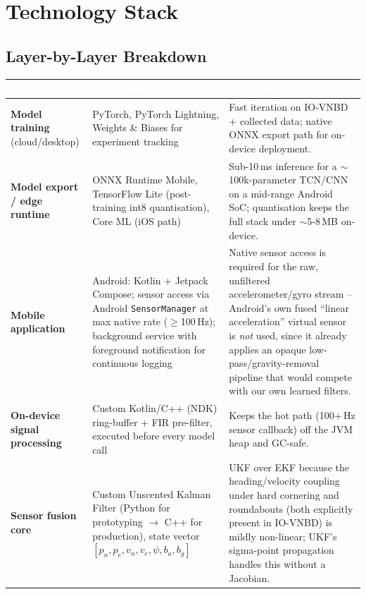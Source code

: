 \documentclass[10.5pt]{article}
\begin{document}
\section{Technology Stack}

\subsection{Layer-by-Layer Breakdown}

\begin{longtable}{@{}p{2.7cm}p{4.6cm}p{7.4cm}@{}}
\toprule
\rowcolor{tablehead}
\textcolor{white}{\textbf{Layer}} & \textcolor{white}{\textbf{Technology}} & \textcolor{white}{\textbf{Why this choice}} \\
\midrule
\endhead
\textbf{Model training} (cloud/desktop) & PyTorch, PyTorch Lightning, Weights \& Biases for experiment tracking & Fast iteration on IO-VNBD + collected data; native ONNX export path for on-device deployment. \\
\textbf{Model export / edge runtime} & ONNX Runtime Mobile, TensorFlow Lite (post-training int8 quantisation), Core ML (iOS path) & Sub-10\,ms inference for a $\sim$100k-parameter TCN/CNN on a mid-range Android SoC; quantisation keeps the full stack under $\sim$5-8\,MB on-device. \\
\textbf{Mobile application} & Android: Kotlin + Jetpack Compose; sensor access via Android \texttt{SensorManager} at max native rate ($\ge$100\,Hz); background service with foreground notification for continuous logging & Native sensor access is required for the raw, unfiltered accelerometer/gyro stream -- Android's own fused ``linear acceleration'' virtual sensor is \emph{not} used, since it already applies an opaque low-pass/gravity-removal pipeline that would compete with our own learned filters. \\
\textbf{On-device signal processing} & Custom Kotlin/C++ (NDK) ring-buffer + FIR pre-filter, executed before every model call & Keeps the hot path (100+\,Hz sensor callback) off the JVM heap and GC-safe. \\
\textbf{Sensor fusion core} & Custom Unscented Kalman Filter (Python for prototyping $\to$ C++ for production), state vector $[p_n, p_e, v_n, v_e, \psi, b_a, b_g]$ & UKF over EKF because the heading/velocity coupling under hard cornering and roundabouts (both explicitly present in IO-VNBD) is mildly non-linear; UKF's sigma-point propagation handles this without a Jacobian. \\

\end{longtable}
\end{document}
